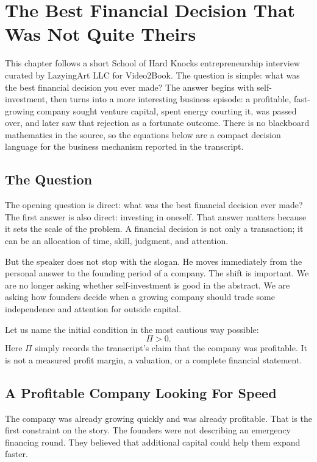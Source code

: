\chapter{The Best Financial Decision That Was Not Quite Theirs}

This chapter follows a short School of Hard Knocks entrepreneurship interview curated by LazyingArt LLC for Video2Book. The question is simple: what was the best financial decision you ever made? The answer begins with self-investment, then turns into a more interesting business episode: a profitable, fast-growing company sought venture capital, spent energy courting it, was passed over, and later saw that rejection as a fortunate outcome. There is no blackboard mathematics in the source, so the equations below are a compact decision language for the business mechanism reported in the transcript.

\section{The Question}

The opening question is direct: what was the best financial decision ever made? The first answer is also direct: investing in oneself. That answer matters because it sets the scale of the problem. A financial decision is not only a transaction; it can be an allocation of time, skill, judgment, and attention.

But the speaker does not stop with the slogan. He moves immediately from the personal answer to the founding period of a company. The shift is important. We are no longer asking whether self-investment is good in the abstract. We are asking how founders decide when a growing company should trade some independence and attention for outside capital.

Let us name the initial condition in the most cautious way possible:
\begin{equation}
\Pi > 0 .
\end{equation}
Here \(\Pi\) simply records the transcript's claim that the company was profitable. It is not a measured profit margin, a valuation, or a complete financial statement.

\section{A Profitable Company Looking For Speed}

The company was already growing quickly and was already profitable. That is the first constraint on the story. The founders were not describing an emergency financing round. They believed that additional capital could help them expand faster.

